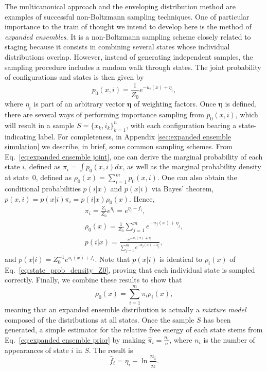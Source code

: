 \documentclass[aip,jcp,reprint,amsmath,amssymb]{revtex4-1}
\newcommand{\vt}[1]{\boldsymbol{\mathbf{#1}}}           %
\begin{document}
The multicanonical approach\cite{Berg_1992, Lee_1993, Abreu_2006} and the enveloping distribution method\cite{Christ_2007, *Christ_2008, *Christ_2009} are examples of successful non-Boltzmann sampling techniques. One of particular importance to the train of thought we intend to develop here is the method of \textit{expanded ensembles}.\cite{Lyubartsev_1992} It is a non-Boltzmann sampling scheme closely related to staging because it consists in combining several states whose individual distributions overlap. However, instead of generating independent samples, the sampling procedure includes a random walk through states. The joint probability of configurations and states is then given by\cite{Nymeyer_2010}
\begin{equation}
\label{eq:expanded ensemble joint}
p_0(x, i) = \frac{1}{Z_0} e^{-u_i(x) + \eta_i},
\end{equation}
where $\eta_i$ is part of an arbitrary vector $\vt \eta$ of weighting factors. Once $\vt \eta$ is defined, there are several ways of performing importance sampling from $p_0(x,i)$, which will result in a sample $S = \{x_k,i_k\}_{k=1}^n$, with each configuration bearing a state-indicating label. For completeness, in Appendix \ref{sec:expanded ensemble simulation} we describe, in brief, some common sampling schemes. From Eq.~\eqref{eq:expanded ensemble joint}, one can derive the marginal probability of each state $i$, defined as $\pi_i = \int p_0(x,i)dx$, as well as the marginal probability density at state~$0$, defined as $\rho_0(x) = \sum_{i=1}^m p_0(x,i)$. One can also obtain the conditional probabilities $p(i|x)$ and $p(x|i)$ via Bayes' theorem, $p(x,i) = p(x|i) \pi_i = p(i|x) \rho_0(x)$. Hence,
\begin{gather}
\pi_i = \frac{Z_i}{Z_0} e^{\eta_i} = e^{\eta_i - f_i}, \label{eq:expanded ensemble prior} \\
\rho_0(x) = \frac{1}{Z_0} \sum_{j=1}^m e^{-u_j(x) + \eta_j}, \label{eq:expanded ensemble evidence} \\
p(i|x) = \frac{e^{-u_i(x) + \eta_i}}{\sum_{j=1}^m e^{-u_j(x) + \eta_j}}, \label{eq:expanded ensemble posterior}
\end{gather}
and $p(x|i) = Z_0^{-1} e^{u_i(x) + f_i}$. Note that $p(x|i)$ is identical to $\rho_i(x)$ of Eq.~\eqref{eq:state_prob_density_Z0}, proving that each individual state is sampled correctly. Finally, we combine these results to show that
\begin{equation}
\label{eq:mixture ensemble}
\rho_0(x) = \sum_{i=1}^m \pi_i \rho_i(x),
\end{equation}
meaning that an expanded ensemble distribution is actually a \textit{mixture model}\cite{Lindsay_1995, Marin_2005} composed of the distributions at all states. Once the sample $S$ has been generated, a simple estimator for the relative free energy of each state stems from Eq.~\eqref{eq:expanded ensemble prior} by making $\hat \pi_i = \frac{n_i}{n}$, where $n_i$ is the number of appearances of state $i$ in $S$. The result is
\begin{equation}
\label{eq:expanded ensemble histogram estimator}
\hat f_i = \eta_i - \ln \frac{n_i}{n}.
\end{equation}
\end{document}
